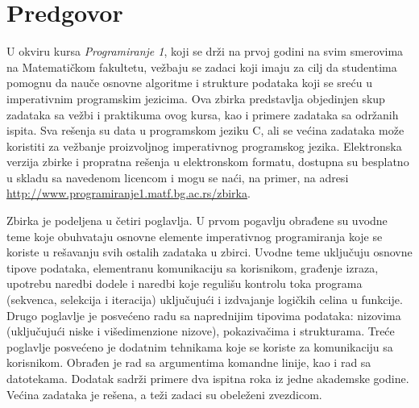 \chapter*{Predgovor}

U okviru kursa {\em Programiranje 1}, koji se drži na prvoj godini na svim smerovima na Matematičkom fakultetu, vežbaju se zadaci koji imaju za cilj da studentima pomognu da nauče osnovne algoritme i strukture podataka koji se sreću u imperativnim programskim jezicima. Ova zbirka predstavlja objedinjen skup zadataka sa vežbi i praktikuma ovog kursa, kao i primere zadataka sa održanih ispita. Sva rešenja su data u programskom jeziku C, ali se većina zadataka može koristiti za vežbanje proizvoljnog imperativnog programskog jezika.
Elektronska verzija zbirke i propratna rešenja u elektronskom formatu, dostupna su besplatno u skladu sa navedenom licencom i mogu se naći, na primer, na adresi \url{http://www.programiranje1.matf.bg.ac.rs/zbirka}.

Zbirka je podeljena u četiri poglavlja. U prvom pogavlju obrađene su uvodne teme koje obuhvataju osnovne elemente imperativnog programiranja koje se koriste u rešavanju svih ostalih zadataka u zbirci. Uvodne teme uključuju osnovne tipove podataka, elementranu komunikaciju sa korisnikom, građenje izraza, upotrebu naredbi dodele i naredbi koje regulišu kontrolu toka programa (sekvenca, selekcija i iteracija) uključujući i izdvajanje logičkih celina u funkcije. Drugo poglavlje je posvećeno radu sa naprednijim tipovima podataka: nizovima (uključujući niske i višedimenzione nizove), pokazivačima i strukturama. Treće poglavlje posvećeno je dodatnim tehnikama koje se koriste za komunikaciju sa korisnikom. Obrađen je rad sa argumentima komandne linije, kao i rad sa datotekama. Dodatak sadrži primere dva ispitna roka iz jedne akademske godine. Većina zadataka je rešena, a teži zadaci su obeleženi zvezdicom.

